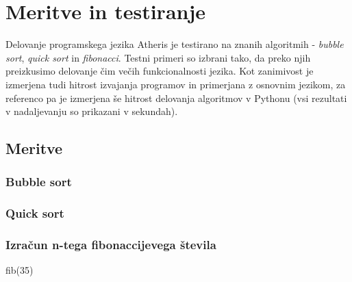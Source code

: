 \documentclass[a4paper, 12p]{book}
\begin{document}
\chapter{Meritve in testiranje}

Delovanje programskega jezika Atheris je testirano na znanih algoritmih - \textit{bubble sort}, \textit{quick sort} in \textit{fibonacci}. Testni primeri so izbrani tako, da preko njih preizkusimo delovanje čim večih funkcionalnosti jezika. Kot zanimivost je izmerjena tudi hitrost izvajanja programov in primerjana z osnovnim jezikom, za referenco pa je izmerjena še hitrost delovanja algoritmov v Pythonu (vsi rezultati v nadaljevanju so prikazani v sekundah).

\section{Meritve}

\subsection{Bubble sort}


\subsection{Quick sort}


\subsection{Izračun n-tega fibonaccijevega števila}

fib(35)\\
\end{document}
